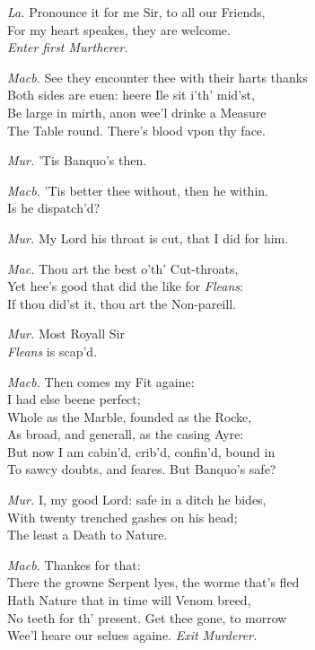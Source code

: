 \documentclass[12pt]{sides}
\newcommand{\clStageDir}[1]{\hspace*{\fill}\textit{#1}\hspace*{\fill}}
\newcommand{\elStageDir}[1]{\hfill\textit{#1}}
\newcommand{\dia}[1]{\hskip 15pt\textit{#1}\hskip 6pt}
\begin{document}
\begin{multicols}{2}
            \dia{La.} Pronounce it for me Sir, to all our Friends, \\ For my heart speakes, they are welcome. \\ \clStageDir{Enter first Murtherer.}

            \dia{Macb.} See they encounter thee with their harts thanks \\ Both sides are euen: heere Ile sit i'th' mid'st, \\ Be large in mirth, anon wee'l drinke a Measure \\ The Table round. There's blood vpon thy face.

            \dia{Mur.} 'Tis Banquo's then.

            \dia{Macb.} 'Tis better thee without, then he within. \\ Is he dispatch'd?

            \dia{Mur.} My Lord his throat is cut, that I did for him.

            \dia{Mac.} Thou art the best o'th' Cut-throats, \\ Yet hee's good that did the like for \textit{Fleans}: \\ If thou did'st it, thou art the Non-pareill.

            \dia{Mur.} Most Royall Sir \\ \textit{Fleans} is scap'd.

            \dia{Macb.} Then comes my Fit againe: \\ I had else beene perfect; \\ Whole as the Marble, founded as the Rocke, \\ As broad, and generall, as the casing Ayre: \\ But now I am cabin'd, crib'd, confin'd, bound in \\ To sawcy doubts, and feares. But Banquo's safe?

            \dia{Mur.} I, my good Lord: safe in a ditch he bides, \\ With twenty trenched gashes on his head; \\ The least a Death to Nature.

            \dia{Macb.} Thankes for that: \\ There the growne Serpent lyes, the worme that's fled \\ Hath Nature that in time will Venom breed, \\ No teeth for th' present. Get thee gone, to morrow \\ Wee'l heare our selues againe. \elStageDir{Exit Murderer.}


\end{multicols}
\end{document}
